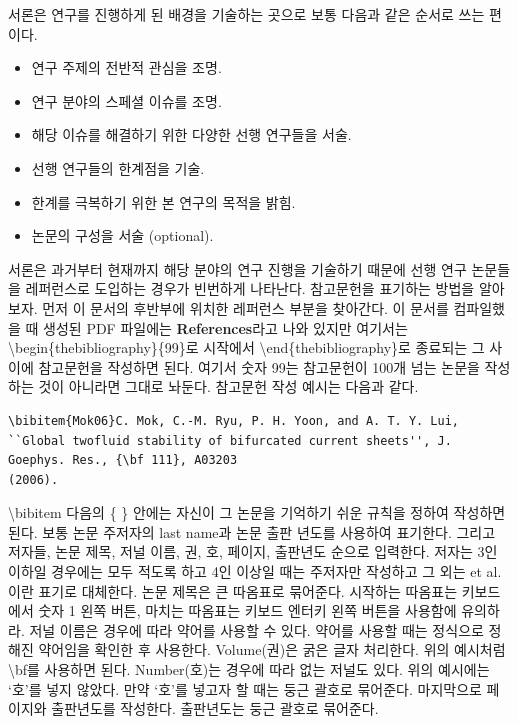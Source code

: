 \documentclass[twoside,11pt]{gshs_thesis}
\begin{document}
서론은 연구를 진행하게 된 배경을 기술하는 곳으로 보통 다음과 같은 순서로 쓰는 편이다.
\begin{itemize}
\item{연구 주제의 전반적 관심을 조명.}
\item{연구 분야의 스페셜 이슈를 조명.}
\item{해당 이슈를 해결하기 위한 다양한 선행 연구들을 서술.}
\item{선행 연구들의 한계점을 기술.}
\item{한계를 극복하기 위한 본 연구의 목적을 밝힘.}
\item{논문의 구성을 서술 (optional).}
\end{itemize}
서론은 과거부터 현재까지 해당 분야의 연구 진행을 기술하기 때문에 선행 연구 논문들을 레퍼런스로 도입하는 경우가 빈번하게 나타난다.  참고문헌을 표기하는 방법을 알아보자. 먼저 이 문서의 후반부에 위치한 레퍼런스 부분을 찾아간다. 이 문서를 컴파일했을 때 생성된 PDF 파일에는 {\bf References}라고 나와 있지만 여기서는 {\textbackslash}begin\{thebibliography\}\{99\}로 시작에서 {\textbackslash}end\{thebibliography\}로 종료되는 그 사이에 참고문헌을 작성하면 된다. 여기서 숫자 99는 참고문헌이 100개 넘는 논문을 작성하는 것이 아니라면 그대로 놔둔다. 참고문헌 작성 예시는 다음과 같다.
\begin{lstlisting}
\bibitem{Mok06}C. Mok, C.-M. Ryu, P. H. Yoon, and A. T. Y. Lui, ``Global twofluid stability of bifurcated current sheets'', J. Goephys. Res., {\bf 111}, A03203
(2006).
\end{lstlisting}
{\textbackslash}bibitem 다음의 \{ \} 안에는 자신이 그 논문을 기억하기 쉬운 규칙을 정하여 작성하면 된다. 보통 논문 주저자의 last name과 논문 출판 년도를 사용하여 표기한다. 그리고 저자들, 논문 제목, 저널 이름, 권, 호, 페이지, 출판년도 순으로 입력한다. 저자는 3인 이하일 경우에는 모두 적도록 하고 4인 이상일 때는 주저자만 작성하고 그 외는 et al.이란 표기로 대체한다. 논문 제목은 큰 따옴표로 묶어준다.  시작하는 따옴표는 키보드에서 숫자 1 왼쪽 버튼, 마치는 따옴표는 키보드 엔터키 왼쪽 버튼을 사용함에 유의하라. 저널 이름은 경우에 따라 약어를 사용할 수 있다. 약어를 사용할 때는 정식으로 정해진 약어임을 확인한 후 사용한다. Volume(권)은 굵은 글자 처리한다. 위의 예시처럼 {\textbackslash}bf를 사용하면 된다. Number(호)는 경우에 따라 없는 저널도 있다. 위의 예시에는 `호'를 넣지 않았다. 만약 `호'를 넣고자 할 때는 둥근 괄호로 묶어준다. 마지막으로 페이지와 출판년도를 작성한다. 출판년도는 둥근 괄호로 묶어준다.
\end{document}

